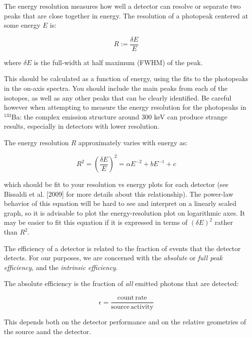 \documentclass{tufte-book}
\begin{document}
The energy resolution measures how well a detector can resolve or separate two peaks that are close together in energy. The resolution of a photopeak centered at some energy $E$ is:

\begin{equation}
    R := \frac{\delta E}{E}
\end{equation}

\noindent where $\delta E$ is the full-width at half maximum (FWHM) of the peak.

This should be calculated as a function of energy, using the fits to the photopeaks in the on-axis spectra. You should include the main peaks from each of the isotopes, as well as any other peaks that can be clearly identified. Be careful however when attempting to measure the energy resolution for the photopeaks in $^{133}$Ba: the complex emission structure around 300 keV can produce strange results, especially in detectors with lower resolution.

The energy resolution $R$ approximately varies with energy as:

\begin{equation}
    R^2 = \left(\frac{\delta E}{E}\right)^2 = \alpha E^{-2} + b E^{-1} + c
\end{equation}

\noindent which should be fit to your resolution vs energy plots for each detector (see Bissaldi et al. [2009] for more details about this relationship). The power-law behavior of this equation will be hard to see and interpret on a linearly scaled graph, so it is advisable to plot the energy-resolution plot on logarithmic axes. It may be easier to fit this equation if it is expressed in terms of $(\delta E)^2$ rather than $R^2$.


The efficiency of a detector is related to the fraction of events that the detector detects. For our purposes, we are concerned with the \textit{absolute} or \textit{full peak efficiency}, and the \textit{intrinsic efficiency}.

The absolute efficiency is the fraction of \textit{all} emitted photons that are detected:

\begin{equation}
    \epsilon = \frac{\mathrm{count\, rate}}{\mathrm{source\, activity}}
\end{equation}

This depends both on the detector performance and on the relative geometries of the source aand the detector.
\end{document}
